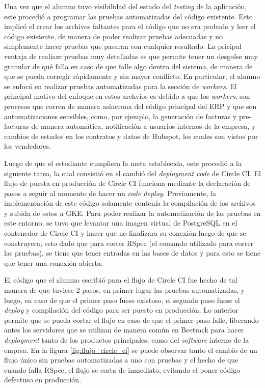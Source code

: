   Una vez que el alumno tuvo visibilidad del estado del \textit{testing} de la aplicación, este procedió a programar las pruebas automatizadas del código existente. Esto implicó el crear los archivos faltantes para el código que no era probado y leer el código existente, de manera de poder realizar pruebas adecuadas y no simplemente hacer pruebas que pasaran con cualquier resultado. La pricipal ventaja de realiazr pruebas muy detalladas es que permite tener un desgolse muy granular de qué falla en caso de que falle algo dentro del sistema, de manera de que se pueda corregir rápidamente y sin mayor conflicto. En particular, el alumno se enfocó en realizar pruebas automatizadas para la sección de \textit{workers}. El principal motivo del enfoque en estos archvios es debido a que los \textit{workers}, son procesos que corren de manera asíncrona del código principal del ERP y que son automatizaciones sensibles, como, por ejemplo, la generación de facturas y pre-facturas de manera automática, notificación a usuarios internos de la empresa, y cambios de estados en los contratos y datos de Hubspot, los cuales son vistos por los vendedores.

  Luego de que el estudiante cumpliera la meta establecida, este procedió a la siguiente tarea, la cual consistió en el cambió del \textit{deployment code} de Circle CI. El flujo de puesta en producción de Circle CI funciona mediante la declaración de pasos a seguir al momento de hacer un \textit{code deploy}. Previamente, la implementación de este código solamente contenía la compilación de los archivos y subida de estos a GKE. Para poder realizar la automatización de las pruebas en este entorno, se tuvo que levantar una imagen virtual de PostgreSQL en el contenedor de Circle CI y hacer que no finalizara su conexión luego de que se construyera, esto dado que para correr RSpec (el comando utilizado para correr las pruebas), se tiene que tener entradas en las bases de datos y para esto se tiene que tener una conexión abierta.

  El código que el alumno escribió para el flujo de Circle CI fue hecho de tal manera de que tuviese 2 pasos, en primer lugar las pruebas automatizadas, y luego, en caso de que el primer paso fuese existoso, el segundo paso fuese el \textit{deploy} y compilación del código para ser puesto en producción. Lo anterior permite que se pueda cortar el flujo en caso de que el primer paso falle, liberando antes los servidores que se utilizan de manera común en Beetrack para hacer \textit{deployment} tanto de los productos principales, como del \textit{software} interno de la emprsa. En la figura \ref{fig:flujo_circle_ci} se puede observar tanto el cambio de un flujo único sin pruebas automatizadas a uno con pruebas y el hecho de que cuando falla RSpec, el flujo se corta de inmediato, evitando el poner código defectuso en producción.

